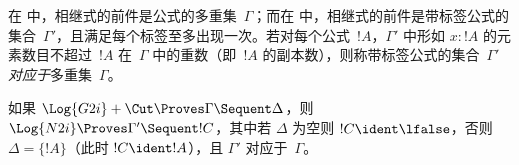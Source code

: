 \documentclass[../../../include/open-logic-section]{subfiles}
\begin{document}


在  中，相继式的前件是公式的多重集~$\Gamma$；而在  中，相继式的前件是带标签公式的集合~$\Gamma'$，且满足每个标签至多出现一次。若对每个公式~$!A$，$\Gamma'$ 中形如 $x : !A$ 的元素数目不超过~$!A$ 在~$\Gamma$ 中的重数（即~$!A$ 的副本数），则称带标签公式的集合~$\Gamma'$ \emph{对应于}多重集~$\Gamma$。

\begin{prop}
如果 $\Log{G2i} + \Cut \Proves \Gamma \Sequent \Delta$，则 $\Log{N2i}
\Proves \Gamma' \Sequent !C$，其中若 $\Delta$ 为空则 $!C \ident \lfalse$，否则 $\Delta = \{!A\}$（此时 $!C \ident !A$），且 $\Gamma'$ 对应于~$\Gamma$。
\end{prop}
\end{document}
